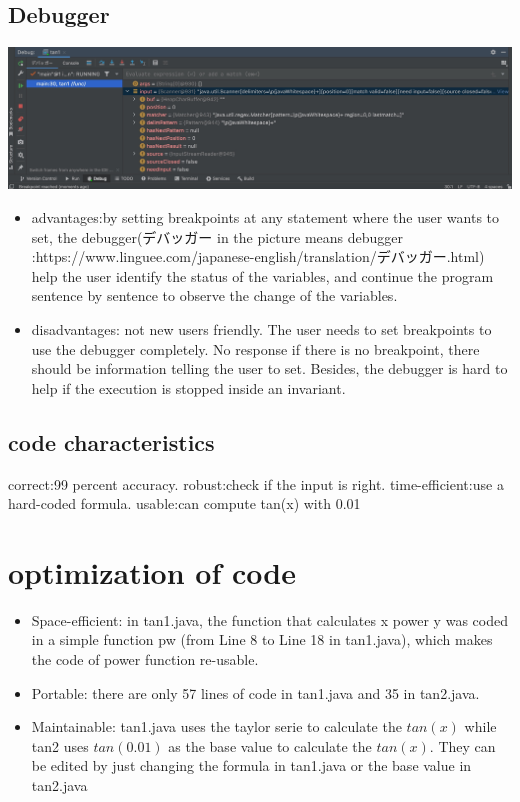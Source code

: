 \documentclass[10pt,a4paper,twoside]{article}
\begin{document}
\subsection{Debugger}
\includegraphics[scale=0.15]{debugger.png}
\begin{itemize}
    \item advantages:by setting breakpoints at any statement where the user wants to set, the debugger(デバッガー in the picture means debugger :https://www.linguee.com/japanese-english/translation/デバッガー.html) help the user identify the status of the variables, and continue the program sentence by sentence to observe the change of the variables.
    
    \item disadvantages: not new users friendly. The user needs to set breakpoints to use the debugger completely. No response if there is no breakpoint, there should be information telling the user to set.
    Besides, the debugger is hard to help if the execution is stopped inside an invariant.
\end{itemize}


\subsection{code characteristics}
correct:99 percent accuracy.
robust:check if the input is right.
time-efficient:use a hard-coded formula.
usable:can compute tan(x) with 0.01
\section{optimization of code}
\begin{itemize}
    \item Space-efficient: in tan1.java, the function that calculates x power y was coded in a simple function pw (from Line 8 to Line 18 in tan1.java), which makes the code of power function re-usable.
    \item Portable: there are only 57 lines of code in tan1.java and 35 in tan2.java.
    \item Maintainable: tan1.java uses the taylor serie to calculate the $tan(x)$ while tan2 uses $tan(0.01)$ as the base value to calculate the $tan(x)$. They can be edited by just changing the formula in tan1.java or the base value in tan2.java 
\end{itemize}
\end{document}
